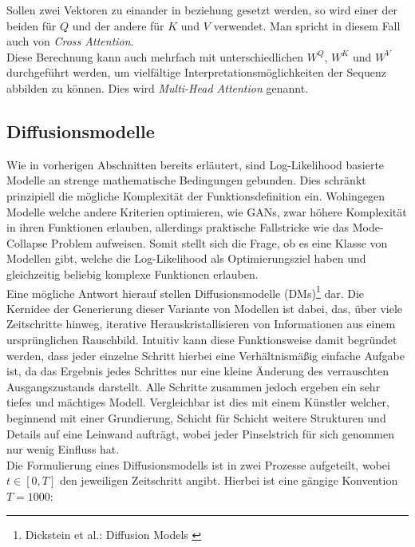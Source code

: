 Sollen zwei Vektoren zu einander in beziehung gesetzt werden, so wird einer der beiden für $Q$ und der andere für $K$ und $V$ verwendet. Man spricht in diesem Fall auch von \textit{Cross Attention}. \\
Diese Berechnung kann auch mehrfach mit unterschiedlichen $W^Q$, $W^K$ und $W^V$ durchgeführt werden, um vielfältige Interpretationsmöglichkeiten der Sequenz abbilden zu können. Dies wird \textit{Multi-Head Attention} genannt.

\subsection{Diffusionsmodelle}
\label{subsec:Grundlagen_DMs}

Wie in vorherigen Abschnitten bereits erläutert, sind Log-Likelihood basierte Modelle an strenge mathematische Bedingungen gebunden. Dies schränkt prinzipiell die mögliche Komplexität der Funktionsdefinition ein. Wohingegen Modelle welche andere Kriterien optimieren, wie \ac{GAN}s, zwar höhere Komplexität in ihren Funktionen erlauben, allerdings praktische Fallstricke wie das Mode-Collapse Problem aufweisen. Somit stellt sich die Frage, ob es eine Klasse von Modellen gibt, welche die Log-Likelihood als Optimierungsziel haben und gleichzeitig beliebig komplexe Funktionen erlauben. \\
Eine mögliche Antwort hierauf stellen Diffusionsmodelle (DMs)\footnote{
    Dickstein et al.: Diffusion Models
    \cite{pmlr-v37-sohl-dickstein15}
} dar. Die Kernidee der Generierung dieser Variante von Modellen ist dabei, das, über viele Zeitschritte hinweg, iterative Herauskristallisieren von Informationen aus einem ursprünglichen Rauschbild. Intuitiv kann diese Funktionsweise damit begründet werden, dass jeder einzelne Schritt hierbei eine Verhältnismäßig einfache Aufgabe ist, da das Ergebnis jedes Schrittes nur eine kleine Änderung des verrauschten Ausgangszustands darstellt. Alle Schritte zusammen jedoch ergeben ein sehr tiefes und mächtiges Modell. Vergleichbar ist dies mit einem Künstler welcher, beginnend mit einer Grundierung, Schicht für Schicht weitere Strukturen und Details auf eine Leinwand aufträgt, wobei jeder Pinselstrich für sich genommen nur wenig Einfluss hat. \\
Die Formulierung eines Diffusionsmodells ist in zwei Prozesse aufgeteilt, wobei $t \in [0,T]$ den jeweiligen Zeitschritt angibt. Hierbei ist eine gängige Konvention $T=1000$: 
